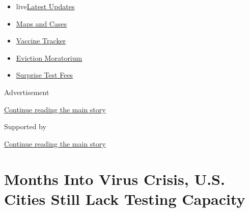 \begin{itemize}
\tightlist
\item
  live\href{https://www.nytimes3xbfgragh.onion/2020/09/09/world/covid-coronavirus.html?name=styln-coronavirus-national\&region=TOP_BANNER\&block=storyline_menu_recirc\&action=click\&pgtype=Article\&impression_id=9ed14ec1-f2d3-11ea-a7cf-ab4cec2f2ffa\&variant=undefined}{Latest
  Updates}
\item
  \href{https://www.nytimes3xbfgragh.onion/interactive/2020/us/coronavirus-us-cases.html?name=styln-coronavirus-national\&region=TOP_BANNER\&block=storyline_menu_recirc\&action=click\&pgtype=Article\&impression_id=9ed14ec2-f2d3-11ea-a7cf-ab4cec2f2ffa\&variant=undefined}{Maps
  and Cases}
\item
  \href{https://www.nytimes3xbfgragh.onion/interactive/2020/science/coronavirus-vaccine-tracker.html?name=styln-coronavirus-national\&region=TOP_BANNER\&block=storyline_menu_recirc\&action=click\&pgtype=Article\&impression_id=9ed14ec3-f2d3-11ea-a7cf-ab4cec2f2ffa\&variant=undefined}{Vaccine
  Tracker}
\item
  \href{https://www.nytimes3xbfgragh.onion/2020/09/02/your-money/eviction-moratorium-covid.html?name=styln-coronavirus-national\&region=TOP_BANNER\&block=storyline_menu_recirc\&action=click\&pgtype=Article\&impression_id=9ed14ec4-f2d3-11ea-a7cf-ab4cec2f2ffa\&variant=undefined}{Eviction
  Moratorium}
\item
  \href{https://www.nytimes3xbfgragh.onion/2020/09/09/upshot/coronavirus-surprise-test-fees.html?name=styln-coronavirus-national\&region=TOP_BANNER\&block=storyline_menu_recirc\&action=click\&pgtype=Article\&impression_id=9ed14ec5-f2d3-11ea-a7cf-ab4cec2f2ffa\&variant=undefined}{Surprise
  Test Fees}
\end{itemize}

Advertisement

\protect\hyperlink{after-top}{Continue reading the main story}

Supported by

\protect\hyperlink{after-sponsor}{Continue reading the main story}

\hypertarget{months-into-virus-crisis-us-cities-still-lack-testing-capacity}{%
\section{Months Into Virus Crisis, U.S. Cities Still Lack Testing
Capacity}\label{months-into-virus-crisis-us-cities-still-lack-testing-capacity}}

